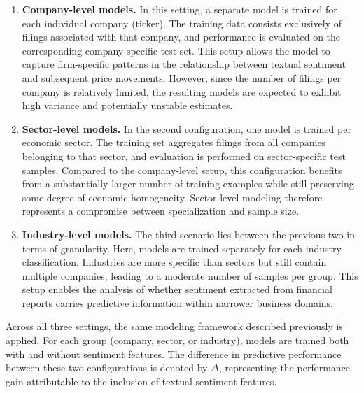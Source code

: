 \begin{enumerate}
    \item \textbf{Company-level models.}  
    In this setting, a separate model is trained for each individual company (ticker). The training data consists exclusively of filings associated with that company, and performance is evaluated on the corresponding company-specific test set. This setup allows the model to capture firm-specific patterns in the relationship between textual sentiment and subsequent price movements. However, since the number of filings per company is relatively limited, the resulting models are expected to exhibit high variance and potentially unstable estimates.

    \item \textbf{Sector-level models.}  
    In the second configuration, one model is trained per economic sector. The training set aggregates filings from all companies belonging to that sector, and evaluation is performed on sector-specific test samples. Compared to the company-level setup, this configuration benefits from a substantially larger number of training examples while still preserving some degree of economic homogeneity. Sector-level modeling therefore represents a compromise between specialization and sample size.

    \item \textbf{Industry-level models.}  
    The third scenario lies between the previous two in terms of granularity. Here, models are trained separately for each industry classification. Industries are more specific than sectors but still contain multiple companies, leading to a moderate number of samples per group. This setup enables the analysis of whether sentiment extracted from financial reports carries predictive information within narrower business domains.
\end{enumerate}

Across all three settings, the same modeling framework described previously is applied. For each group (company, sector, or industry), models are trained both with and without sentiment features. 
The difference in predictive performance between these two configurations is denoted by $\Delta$, representing the performance gain attributable to the inclusion of textual sentiment features.

